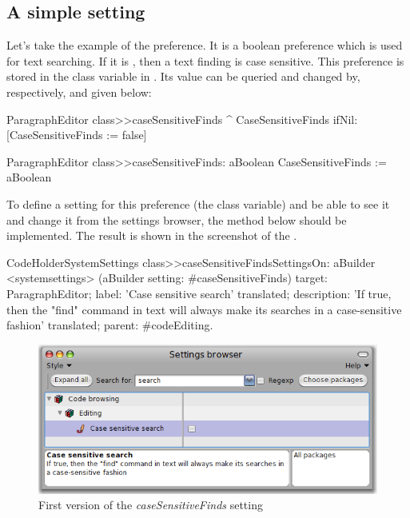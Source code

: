 \documentclass[a4paper,10pt,twoside]{book}
\begin{document}
\subsection{A simple setting}
Let's take the example of the  preference. It is a boolean preference which is used for text searching. If it is , then a text finding is case sensitive. This preference is stored in the  class variable in . Its value can be queried and changed by, respectively,  and  given below:
\begin{code}{}
ParagraphEditor class>>caseSensitiveFinds
	^ CaseSensitiveFinds ifNil: [CaseSensitiveFinds := false]

ParagraphEditor class>>caseSensitiveFinds: aBoolean
	CaseSensitiveFinds := aBoolean
\end{code}

To define a setting for this preference (the  class variable) and be able to see it and change it from the settings browser, the method below should be implemented. The result is shown in the screenshot of the . 

\begin{code}{}
CodeHolderSystemSettings class>>caseSensitiveFindsSettingsOn: aBuilder
	<systemsettings>
	(aBuilder setting: #caseSensitiveFinds) 
		target: ParagraphEditor;
		label: 'Case sensitive search' translated;
		description: 'If true, then the "find" command in text will always make its searches in a case-sensitive fashion' translated;
		parent: #codeEditing.
\end{code}

\begin{figure}[tbh]
\begin{center}
\includegraphics[scale=0.4]{caseSensitiveFinds_setting_declaration1}
\caption{First version of the \textit{caseSensitiveFinds} setting}
\end{center}
\end{figure}
\end{document}

